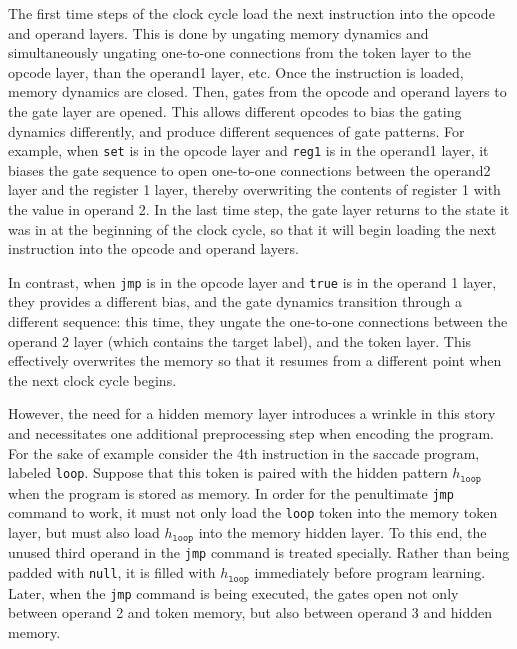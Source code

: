 \documentclass[pdftex,12pt,letterpaper]{article}
\begin{document}
The first time steps of the clock cycle load the next instruction into the opcode and operand layers.  This is done by ungating memory dynamics and simultaneously ungating one-to-one connections from the token layer to the opcode layer, than the operand1 layer, etc.  Once the instruction is loaded, memory dynamics are closed.  Then, gates from the opcode and operand layers to the gate layer are opened.  This allows different opcodes to bias the gating dynamics differently, and produce different sequences of gate patterns.  For example, when \texttt{set} is in the opcode layer and \texttt{reg1} is in the operand1 layer, it biases the gate sequence to open one-to-one connections between the operand2 layer and the register 1 layer, thereby overwriting the contents of register 1 with the value in operand 2.  In the last time step, the gate layer returns to the state it was in at the beginning of the clock cycle, so that it will begin loading the next instruction into the opcode and operand layers.

In contrast, when \texttt{jmp} is in the opcode layer and \texttt{true} is in the operand 1 layer, they provides a different bias, and the gate dynamics transition through a different sequence:  this time, they ungate the one-to-one connections between the operand 2 layer (which contains the target label), and the token layer.  This effectively overwrites the memory so that it resumes from a different point when the next clock cycle begins.

However, the need for a hidden memory layer introduces a wrinkle in this story and necessitates one additional preprocessing step when encoding the program.  For the sake of example consider the 4th instruction in the saccade program, labeled \texttt{loop}.  Suppose that this token is paired with the hidden pattern \texttt{$h_\texttt{loop}$} when the program is stored as memory.  In order for the penultimate \texttt{jmp} command to work, it must not only load the \texttt{loop} token into the memory token layer, but must also load \texttt{$h_\texttt{loop}$} into the memory hidden layer.  To this end, the unused third operand in the \texttt{jmp} command is treated specially.  Rather than being padded with \texttt{null}, it is filled with \texttt{$h_\texttt{loop}$} immediately before program learning.  Later, when the \texttt{jmp} command is being executed, the gates open not only between operand 2 and token memory, but also between operand 3 and hidden memory.
\end{document}
